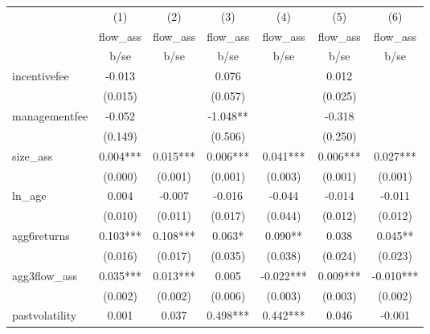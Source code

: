 {
\def\sym#1{\ifmmode^{#1}\else\(^{#1}\)\fi}
\begin{tabular}{l*{6}{c}}
\hline\hline
            &\multicolumn{1}{c}{(1)}&\multicolumn{1}{c}{(2)}&\multicolumn{1}{c}{(3)}&\multicolumn{1}{c}{(4)}&\multicolumn{1}{c}{(5)}&\multicolumn{1}{c}{(6)}\\
            &\multicolumn{1}{c}{flow\_ass}&\multicolumn{1}{c}{flow\_ass}&\multicolumn{1}{c}{flow\_ass}&\multicolumn{1}{c}{flow\_ass}&\multicolumn{1}{c}{flow\_ass}&\multicolumn{1}{c}{flow\_ass}\\
            &        b/se   &        b/se   &        b/se   &        b/se   &        b/se   &        b/se   \\
\hline
incentivefee&      -0.013   &               &       0.076   &               &       0.012   &               \\
            &     (0.015)   &               &     (0.057)   &               &     (0.025)   &               \\
[1em]
managementfee&      -0.052   &               &      -1.048** &               &      -0.318   &               \\
            &     (0.149)   &               &     (0.506)   &               &     (0.250)   &               \\
[1em]
size\_ass    &       0.004***&       0.015***&       0.006***&       0.041***&       0.006***&       0.027***\\
            &     (0.000)   &     (0.001)   &     (0.001)   &     (0.003)   &     (0.001)   &     (0.001)   \\
[1em]
ln\_age      &       0.004   &      -0.007   &      -0.016   &      -0.044   &      -0.014   &      -0.011   \\
            &     (0.010)   &     (0.011)   &     (0.017)   &     (0.044)   &     (0.012)   &     (0.012)   \\
[1em]
agg6returns &       0.103***&       0.108***&       0.063*  &       0.090** &       0.038   &       0.045** \\
            &     (0.016)   &     (0.017)   &     (0.035)   &     (0.038)   &     (0.024)   &     (0.023)   \\
[1em]
agg3flow\_ass&       0.035***&       0.013***&       0.005   &      -0.022***&       0.009***&      -0.010***\\
            &     (0.002)   &     (0.002)   &     (0.006)   &     (0.003)   &     (0.003)   &     (0.002)   \\
[1em]
pastvolatility&       0.001   &       0.037   &       0.498***&       0.442***&       0.046   &      -0.001   \\

\end{tabular}}

